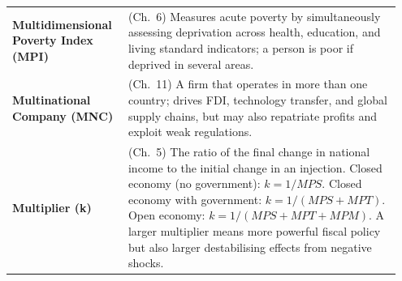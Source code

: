 \documentclass[11pt, a4paper, twoside]{book}
\begin{document}
\begin{longtable}{@{}>{\RaggedRight\arraybackslash}p{0.28\linewidth}>{\RaggedRight\arraybackslash}p{0.67\linewidth}@{}}
\textbf{Multidimensional Poverty Index (MPI)} & (Ch.~6) Measures acute poverty by simultaneously assessing deprivation across health, education, and living standard indicators; a person is poor if deprived in several areas. \\
\textbf{Multinational Company (MNC)} & (Ch.~11) A firm that operates in more than one country; drives FDI, technology transfer, and global supply chains, but may also repatriate profits and exploit weak regulations. \\
\textbf{Multiplier (k)} & (Ch.~5) The ratio of the final change in national income to the initial change in an injection. Closed economy (no government): $k = 1/MPS$. Closed economy with government: $k = 1/(MPS + MPT)$. Open economy: $k = 1/(MPS + MPT + MPM)$. A larger multiplier means more powerful fiscal policy but also larger destabilising effects from negative shocks. \\


\end{longtable}
\end{document}
